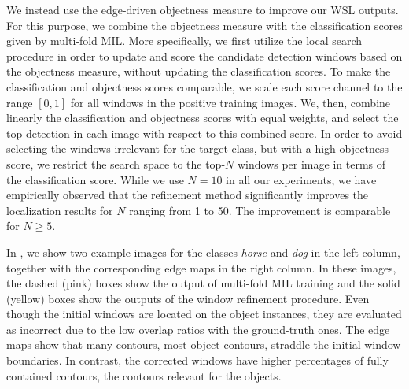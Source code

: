 \documentclass[10pt,journal,cspaper,final,twocolumn,compsoc]{./IEEEtran}
\begin{document}
We instead use the edge-driven objectness measure to improve our WSL
outputs. For this
purpose, we combine the objectness measure with the
classification scores given by multi-fold MIL.
More specifically, we first utilize the local search
procedure in order to update and score the 
candidate detection windows based on the objectness measure,
without updating
the classification scores. 
To make the classification and
objectness scores comparable, we scale each score channel
to the range $[0,1]$ for all windows in the positive
training images.  We, then, combine linearly the
classification and objectness scores with equal
weights, and select the top detection in each image with
respect to this combined score. In order to avoid selecting the
windows irrelevant for the target class, but with a high objectness
score, we restrict the search space to the top-$N$ windows per image
in terms of the classification score. While we use $N=10$ in all our experiments,
we have empirically observed that the refinement method significantly
improves the localization results for  $N$ ranging from 1 to 50. 
The improvement is comparable for  $N\geq 5$. 

In , we show two example images for the
classes {\em horse} and {\em dog} in the left column,
together with the corresponding edge maps in the right
column. In these images, the dashed (pink) boxes show the
output of multi-fold MIL training and the solid (yellow)
boxes show the outputs of the window refinement procedure.
Even though the initial windows are located on the object
instances, they are evaluated as incorrect due to the low
overlap ratios with the ground-truth ones. The edge
maps show that many contours, \ie most object contours, straddle
the initial window boundaries. In contrast, the corrected
windows have higher percentages of fully contained contours, \ie the contours relevant for the objects.
\end{document}
